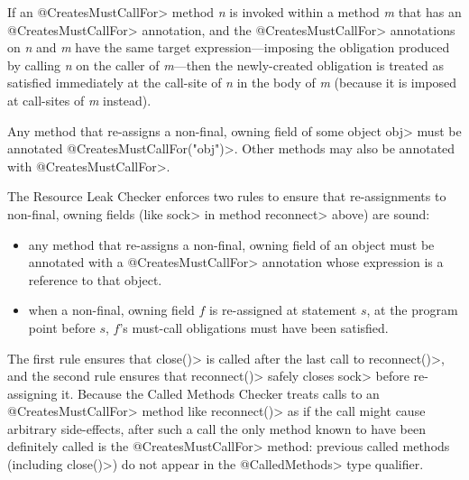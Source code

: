 If an \<@CreatesMustCallFor>
method \emph{n} is invoked within a method \emph{m} that has an \<@CreatesMustCallFor> annotation,
and the \<@CreatesMustCallFor> annotations on \emph{n} and \emph{m} have
the same target expression---imposing the obligation produced by calling \emph{n} on the caller of \emph{m}---then
the newly-created obligation is treated as satisfied immediately
at the call-site of \emph{n} in the body of \emph{m} (because it is imposed at call-sites of \emph{m}
instead).



Any method that re-assigns a non-final, owning field of some object \<obj>
must be annotated \<@CreatesMustCallFor("obj")>.
Other methods may also be annotated with \<@CreatesMustCallFor>.

The Resource Leak Checker enforces two rules to ensure that re-assignments
to non-final, owning fields (like \<sock> in method \<reconnect> above) are
sound:
\begin{itemize}
\item any method that re-assigns a non-final, owning field of an object
  must be annotated with a \<@CreatesMustCallFor> annotation
  whose expression is a reference to that object.
\item when a non-final, owning field $f$ is re-assigned at statement $s$,
  at the program point before $s$, $f$'s must-call obligations must have been satisfied.
\end{itemize}
\noindent
The first rule ensures that \<close()> is called after the last call
to \<reconnect()>, and the second rule ensures that \<reconnect()>
safely closes \<sock> before re-assigning it. Because the Called Methods Checker
treats calls to an \<@CreatesMustCallFor> method like \<reconnect()> as if the call might
cause arbitrary side-effects, after such a call the only method known to have been
definitely called is the \<@CreatesMustCallFor> method: previous called
methods (including \<close()>) do not appear in the \<@CalledMethods> type qualifier.


